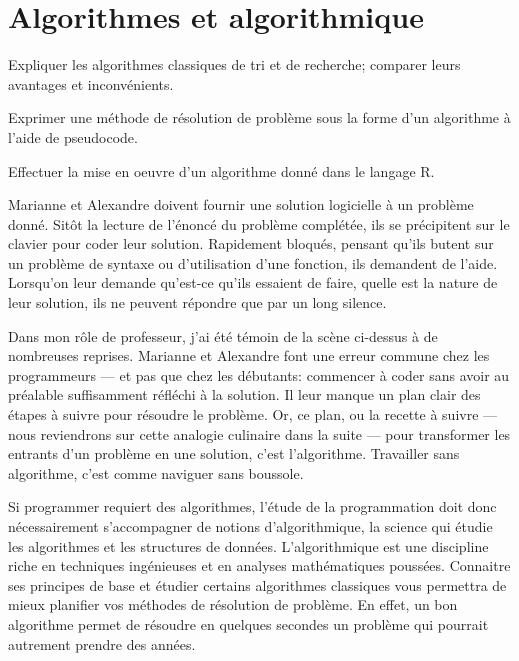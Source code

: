 
\chapter{Algorithmes et algorithmique}
\label{chap:algorithmes}

\def\scriptfilename{\currfilebase.R}

\begin{objectifs}
\item Expliquer les algorithmes classiques de tri et de recherche;
  comparer leurs avantages et inconvénients.
\item Exprimer une méthode de résolution de problème sous la forme
  d'un algorithme à l'aide de pseudocode.
\item Effectuer la mise en oeuvre d'un algorithme donné dans le
  langage R.
\end{objectifs}

Marianne et Alexandre doivent fournir une solution logicielle à un
problème donné. Sitôt la lecture de l'énoncé du problème complétée,
ils se précipitent sur le clavier pour coder leur solution. Rapidement
bloqués, pensant qu'ils butent sur un problème de syntaxe ou
d'utilisation d'une fonction, ils demandent de l'aide. Lorsqu'on leur
demande qu'est-ce qu'ils essaient de faire, quelle est la nature de leur
solution, ils ne peuvent répondre que par un long silence.

Dans mon rôle de professeur, j'ai été témoin de la scène ci-dessus à
de nombreuses reprises. Marianne et Alexandre font une erreur commune
chez les programmeurs --- et pas que chez les débutants: commencer à
coder sans avoir au préalable suffisamment réfléchi à la solution. Il
leur manque un plan clair des étapes à suivre pour résoudre le
problème. Or, ce plan, ou la recette à suivre --- nous reviendrons sur
cette analogie culinaire dans la suite --- pour transformer les
entrants d'un problème en une solution, c'est l'algorithme. Travailler
sans algorithme, c'est comme naviguer sans boussole.

Si programmer requiert des algorithmes, l'étude de la programmation
doit donc nécessairement s'accompagner de notions
d'algorithmique, la science qui étudie les
algorithmes et les structures de données. L'algorithmique est une
discipline riche en techniques ingénieuses et en analyses
mathématiques poussées. Connaitre ses principes de base et étudier
certains algorithmes classiques vous permettra de mieux planifier vos
méthodes de résolution de problème. En effet, un bon algorithme permet
de résoudre en quelques secondes un problème qui pourrait autrement
prendre des années.

